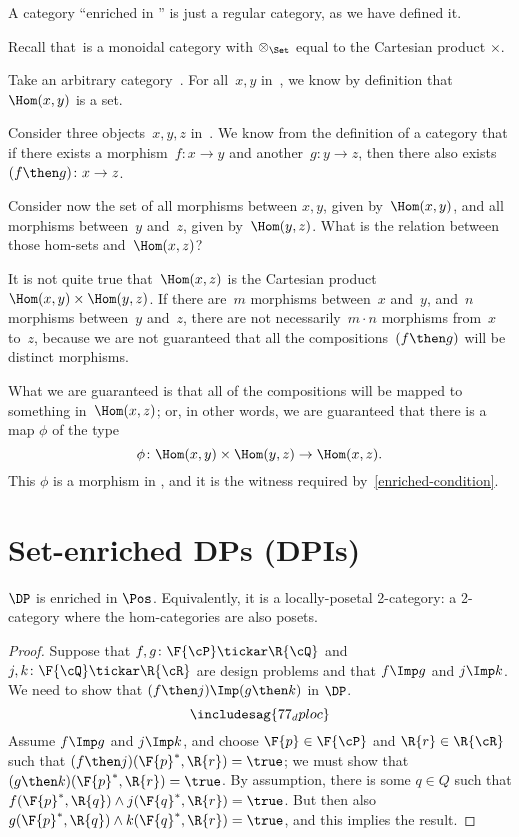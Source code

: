 \begin{example}
A category ``enriched in \Set'' is just a regular category, as we have defined it.

Recall that~\Set is a monoidal category with $\otimes_{\Set}$ equal to the Cartesian product $\times$.

Take an arbitrary category~\CatC. For all~$x, y$ in~\CatC, we know by definition
that~$\Hom(x,y)$ is a set.

Consider three objects~$x,y,z$ in~\CatC. We know from the definition of a
category that if there exists a morphism~$f: x \to y$ and another~$g: y \to z$,
then there also exists~$(f\then g)\colon x \to z$.

Consider now the set of all morphisms between $x, y$, given by~$\Hom(x,y)$, and
all morphisms between~$y$ and~$z$, given by~$\Hom(y, z)$. What is the relation
between those hom-sets and~$\Hom(x, z)$?

It is not quite true that~$\Hom(x, z)$ is the Cartesian product~$\Hom(x, y)
\times \Hom(y, z)$. If there are~$m$ morphisms between~$x$ and~$y$, and~$n$
morphisms between~$y$ and~$z$, there are not necessarily~$m \cdot n$ morphisms
from~$x$ to~$z$, because we are not guaranteed that all the compositions~$(f\then g)$
will be distinct morphisms.

What we are guaranteed is that all of the compositions will be mapped to something in~$\Hom(x, z)$; or, in other words, we are guaranteed that there
is a map $\phi$ of the type
\begin{equation}
    \phi \colon \Hom(x, y) \times \Hom(y, z) \rightarrow \Hom(x, z).
\end{equation}
This $\phi$ is a morphism in \Set, and it is the witness required by~\eqref{enriched-condition}.

\end{example}


\clearpage

\section{Set-enriched DPs (DPIs)}

\begin{proposition}\label{prop:DP_loc_pos}
$\DP$ is enriched in $\Pos$. Equivalently, it is a locally-posetal 2-category: a 2-category where the hom-categories are also posets.
\end{proposition}
\begin{proof}
Suppose that $f,g\colon \F{\cP} \tickar \R{\cQ}$ and $j,k\colon \F{\cQ} \tickar \R{\cR}$ are design problems and that $f\Imp g$ and $j\Imp k$. We need to show that $(f\then j)\Imp(g\then k)$ in $\DP$.
\begin{equation}
\includesag{77_dploc}
\end{equation}
Assume $f\Imp g$ and $j\Imp k$, and choose $\F{p}\in\F{\cP} $ and $\R{r}\in\R{\cR}$ such that $(f\then j)(\F{p}^*,\R{r})=\true$; we must show that $(g \then k)(\F{p}^*,\R{r})=\true$. By assumption, there is some $q\in Q$ such that $f(\F{p}^*,\R{q})\wedge j(\F{q}^*,\R{r})=\true$. But then also $g(\F{p}^*,\R{q})\wedge k(\F{q}^*,\R{r})=\true$, and this implies the result.
\end{proof}


